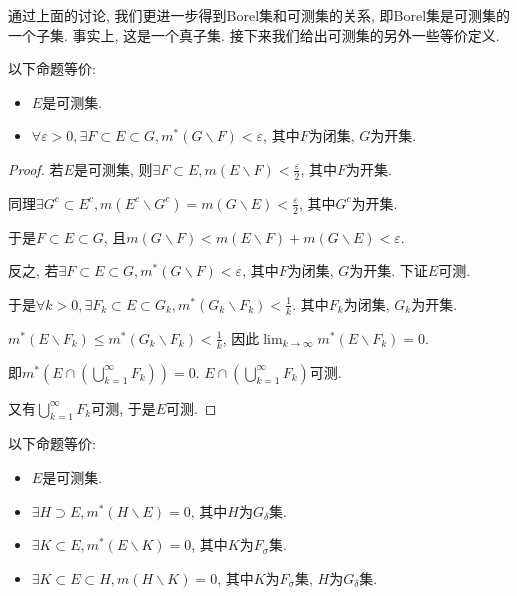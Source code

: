 \documentclass[theorem=false,mathfont=none,openany,sub3section]{easybook}
\begin{document}
通过上面的讨论, 我们更进一步得到Borel集和可测集的关系, 即Borel集是可测集的一个子集. 事实上, 这是一个真子集. 接下来我们给出可测集的另外一些等价定义.\par

\begin{lemma}
  以下命题等价:\par
  \begin{itemize}
    \item $E$是可测集.
    \item $\forall \varepsilon>0, \exists F\subset E\subset G, m^{*}(G\backslash F)<\varepsilon $, 其中$F$为闭集, $G$为开集.
  \end{itemize}
\end{lemma}

\begin{proof}
  若$E$是可测集, 则$\exists F\subset E, m(E\backslash F)<\frac{\varepsilon}{2}$, 其中$F$为开集.\par
  同理$\exists G^c\subset E^c, m(E^c\backslash G^c)=m(G\backslash E)<\frac{\varepsilon}{2}$, 其中$G^c$为开集.\par
  于是$F\subset E\subset G$, 且$m(G\backslash F)<m(E\backslash F)+m(G\backslash E)<\varepsilon$.\par
  反之, 若$\exists F\subset E\subset G, m^{*}(G\backslash F)<\varepsilon $, 其中$F$为闭集, $G$为开集. 下证$E$可测.\par
  于是$\forall k>0, \exists F_k\subset E\subset G_k, m^{*}(G_k\backslash F_k)<\frac{1}{k}$. 其中$F_k$为闭集, $G_k$为开集.\par
  $m^{*}(E\backslash F_k)\leqslant m^{*}(G_k\backslash F_k)<\frac{1}{k}$, 因此$\lim_{k \to \infty}m^{*}(E\backslash F_k)=0$.\par
  即$m^{*}(E\cap (\bigcup_{k=1}^{\infty}F_k))=0$. $E\cap (\bigcup_{k=1}^{\infty}F_k)$可测.\par
  又有$\bigcup_{k=1}^{\infty}F_k$可测, 于是$E$可测.\par
\end{proof}

\begin{theorem}
  以下命题等价:\par
  \begin{itemize}
    \item $E$是可测集.
    \item $\exists H\supset E, m^{*}(H\backslash E)=0$, 其中$H$为$G_{\delta}$集.
    \item $\exists K\subset E, m^{*}(E\backslash K)=0$, 其中$K$为$F_{\sigma}$集.
    \item $\exists K\subset E\subset H, m(H\backslash K)=0$, 其中$K$为$F_{\sigma}$集, $H$为$G_{\delta}$集.
  \end{itemize}
\end{theorem}
\end{document}
